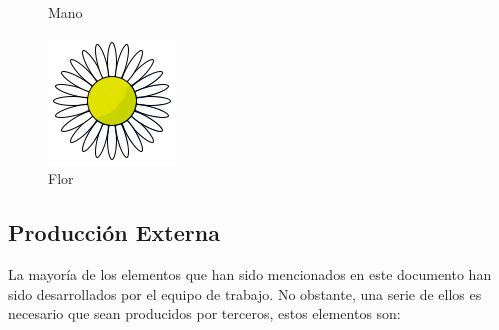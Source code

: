 \begin{figure}[h]
\begin{minipage}{.25\textwidth}
        \caption{Mano}
        \label{fig:mano}
    \end{minipage}
    \begin{minipage}{.25\textwidth}
        \includegraphics[width=\textwidth]{imgs/daisy.png}
        \caption{Flor}
        \label{fig:flor}
    \end{minipage}
\end{figure}

\subsection{Producción Externa}
La mayoría de los elementos que han sido mencionados en este documento han sido desarrollados por el equipo de trabajo. No obstante, una serie de ellos es necesario que sean producidos por terceros, estos elementos son:

